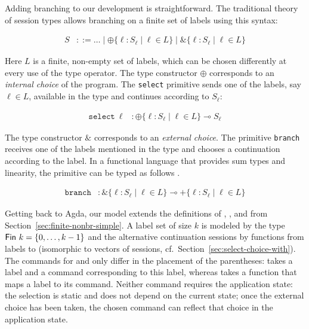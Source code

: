 \documentclass[acmsmall,review,anonymous,screen]{acmart}
\newenvironment{traditional}{\begin{tcolorbox}[size=tight,arc=0ex,boxrule=0ex,colback=blue!20,top=-1.5ex]}{\end{tcolorbox}}
\begin{document}
Adding branching to our development is straightforward. The traditional 
theory of session types allows branching on a finite set of labels using this syntax:
\begin{traditional}
  \begin{align*}
    S & ::= \dots \mid \oplus\{ \ell : S_\ell \mid \ell \in L \} \mid
        \&\{\ell: S_\ell \mid \ell \in L\}
  \end{align*}
\end{traditional}
Here $L$ is a finite, non-empty set of labels, which can be chosen differently at
every use of the type operator. 
The type constructor $\oplus$ corresponds to an \emph{internal choice} of the
program.  The \texttt{select} primitive sends one of the labels, say $\ell \in L$, available in the
type and continues according to $S_\ell$:
\begin{traditional}
  \begin{align*}
    \mathtt{select}\ \ell &: \oplus\{ \ell : S_\ell \mid \ell \in L \}
                            \multimap S_\ell
  \end{align*}
\end{traditional}
The type constructor $\&$ corresponds to an \emph{external choice}. The
primitive \texttt{branch} receives one of the labels 
mentioned in the type and chooses a continuation according to the
label. In a functional language that provides sum types and linearity,
the primitive can be typed as follows \cite{DBLP:journals/toplas/Padovani19}.
\begin{traditional}
  \begin{align*}
    \mathtt{branch} &: \&\{\ell: S_\ell \mid \ell \in L\} \multimap +\{\ell: S_\ell \mid \ell \in L\}
  \end{align*}
\end{traditional}
Getting back to Agda, our model extends the definitions of
{\ASession}, {\ACommand}, and {\Aexecutor} from
Section~\ref{sec:finite-nonbr-simple}. A label set of size $k$ is
modeled by the type $\AFin~k = \{ 0, \dots, k-1\}$ and the alternative continuation sessions by
functions from labels to {\ASession} (isomorphic to vectors of sessions, cf.\  Section~\ref{sec:select-choice-with}).
\stBranchingType
\stBranchingCommand
The commands for {\ACSELECT} and {\ACCHOICE} only differ in the
placement of the parentheses: {\ACSELECT} takes a label and a command
corresponding to this label, whereas {\ACCHOICE} takes a function that
maps a label to its command. Neither command requires the application
state: the selection is static and does not depend on the current
state; once the external choice has been taken, the chosen command can
reflect that choice in the application state.
\stExecutorSignature\vspace{-1.5\baselineskip}
\stBranchingExecutor
\end{document}
